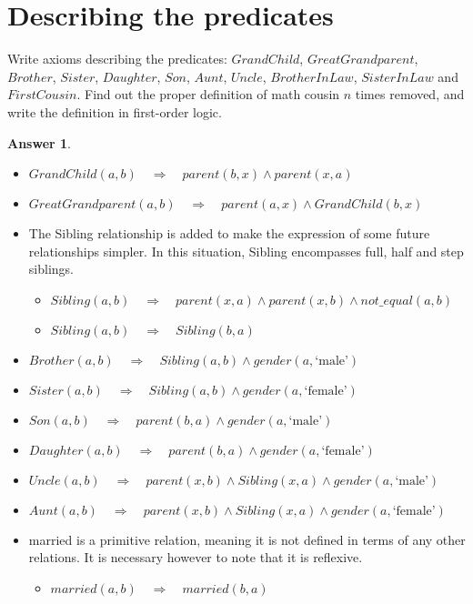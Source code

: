\documentclass[a4paper]{article}
\renewcommand{\(}{\left(}
\renewcommand{\)}{\right)}
\theoremstyle{plain}
\theoremstyle{plain}
\theoremstyle{definition}
\newtheorem*{answer}{Answer}
\begin{document}
\section{Describing the predicates}
Write axioms describing the predicates: $GrandChild$, $GreatGrandparent$, $Brother$, $Sister$, $Daughter$, $Son$, $Aunt$, $Uncle$, $BrotherInLaw$, $SisterInLaw$ and $FirstCousin$. Find out the proper definition of math cousin $n$ times removed, and write the definition in first-order logic.
\begin{shaded}
\begin{answer}
$$ $$
\begin{itemize}
  \item $ GrandChild(a,b) \quad \Rightarrow \quad parent(b,x) \wedge parent(x,a) $
  \item $ GreatGrandparent(a,b) \quad \Rightarrow \quad parent(a,x) \wedge GrandChild(b,x) $
  \item The Sibling relationship is added to make the expression of some future relationships simpler. In this situation, Sibling encompasses full, half and step siblings.
      \begin{itemize}
        \item $ Sibling(a,b) \quad \Rightarrow \quad  parent(x,a) \wedge parent(x,b) \wedge not\_equal(a,b) $
        \item $ Sibling(a,b) \quad \Rightarrow \quad Sibling(b,a) $
      \end{itemize}
  \item $Brother(a,b) \quad \Rightarrow \quad Sibling(a,b) \wedge gender(a,\text{`male'})$
  \item $Sister(a,b) \quad \Rightarrow \quad Sibling(a,b) \wedge gender(a,\text{`female'})$
  \item $Son(a,b) \quad \Rightarrow \quad parent(b,a) \wedge gender(a,\text{`male'})$
  \item $ Daughter(a,b) \quad \Rightarrow \quad parent(b,a) \wedge gender(a,\text{`female'})$
  \item $ Uncle(a,b) \quad \Rightarrow \quad parent(x,b) \wedge Sibling(x,a) \wedge gender(a,\text{`male'}) $
  \item $ Aunt(a,b) \quad \Rightarrow \quad parent(x,b) \wedge Sibling(x,a) \wedge gender(a,\text{`female'}) $
  \item married is a primitive relation, meaning it is not defined in terms of any other relations. It is necessary however to note that it is reflexive.
      \begin{itemize}
        \item $married(a,b) \quad \Rightarrow \quad married(b,a)$

\end{itemize}
\end{itemize}
\end{answer}
\end{shaded}
\end{document}
